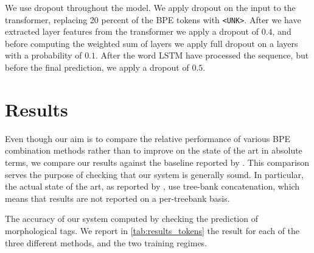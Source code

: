 \documentclass[11pt]{article}
\newcommand\citet{\cite}
\begin{document}
        We use dropout throughout the model. We apply dropout on the
        input to the transformer, replacing 20 percent of the BPE tokens
        with \texttt{<UNK>}. After we have extracted layer features
        from the transformer we apply a dropout of $0.4$, and before
        computing the weighted sum of layers we apply full dropout on
        a layers with a probability of $0.1$. After the word LSTM have
        processed the sequence, but before the final prediction, we
        apply a dropout of $0.5$.

	
	\section{Results}
	\label{results}

        Even though our aim is to compare the relative performance of
        various BPE combination methods rather than to improve on the
        state of the art in absolute terms, we compare our results
        against the baseline reported by
        \citet{mccarthy2019sigmorphon}. This comparison serves the
        purpose of checking that our system is generally sound.  In
        particular, the actual state of the art, as reported by
        \citet{mccarthy2019sigmorphon}, use tree-bank concatenation,
        which means that results are not reported on a per-treebank
        basis.

        The accuracy of our system computed by checking the prediction
        of morphological tags. We report in \cref{tab:results_tokens}
        the result for each of the three different methods, and the
        two training regimes.
\end{document}
